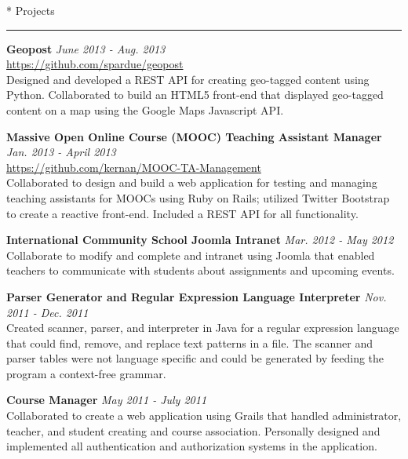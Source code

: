 \documentclass{article}
\makeatletter
\renewcommand{\section}[1]{
	\vspace{0.75em} %
	\@startsection
		{section}
		{1}
		{\z@}
		{0em}
		{1em \@minus 1em} %
		{\normalfont\large\sc\bfseries}
		*
		{#1}
	\vspace{-0.75em} %
	\hrule
	\vspace{0.25em} %
	\par
}
\newcommand{\entry}[1]{\def \@entry {#1}}
\newcommand{\dates}[1]{\def \@dates {#1}}
\newenvironment{datedentry}{
		\vspace{0.5em} %
		{\bf \@entry} \hfill {\it \@dates} \\
	}{}
\makeatother
\begin{document}
\section{Projects}

\entry{Geopost}
\dates{June 2013 - Aug. 2013}
\begin{datedentry}
\url{https://github.com/spardue/geopost} \\
Designed and developed a REST API for creating geo-tagged content using Python.
Collaborated to build an HTML5 front-end that displayed geo-tagged content on a
map using the Google Maps Javascript API.
\end{datedentry}

\entry{Massive Open Online Course (MOOC) Teaching Assistant Manager}
\dates{Jan. 2013 - April 2013}
\begin{datedentry}
\url{https://github.com/kernan/MOOC-TA-Management} \\
Collaborated to design and build a web application for testing and managing
teaching assistants for MOOCs using Ruby on Rails; utilized Twitter Bootstrap to
create a reactive front-end. Included a REST API for all functionality.
\end{datedentry}

\entry{International Community School Joomla Intranet}
\dates{Mar. 2012 - May 2012}
\begin{datedentry}
Collaborate to modify and complete and intranet using Joomla that enabled
teachers to communicate with students about assignments and upcoming events.
\end{datedentry}

\entry{Parser Generator and Regular Expression Language Interpreter}
\dates{Nov. 2011 - Dec. 2011}
\begin{datedentry}
Created scanner, parser, and interpreter in Java for a regular expression
language that could find, remove, and replace text patterns in a file. The
scanner and parser tables were not language specific and could be generated by
feeding the program a context-free grammar.
\end{datedentry}

\entry{Course Manager}
\dates{May 2011 - July 2011}
\begin{datedentry}
Collaborated to create a web application using Grails that handled
administrator, teacher, and student creating and course association. Personally
designed and implemented all authentication and authorization systems in the
application.
\end{datedentry}
\end{document}
